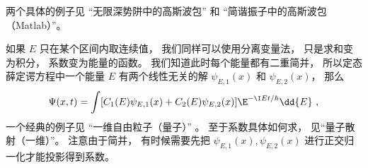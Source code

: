两个具体的例子见 “无限深势阱中的高斯波包” 和 “简谐振子中的高斯波包（Matlab）”。

如果 $E$ 只在某个区间内取连续值， 我们同样可以使用分离变量法， 只是求和变为积分， 系数变为能量的函数。 我们知道此时每个能量都有二重简并， 所以定态薛定谔方程中一个能量 $E$ 有两个线性无关的解 $\psi_{E,1}(x)$ 和 $\psi_{E,2}(x)$， 那么
\begin{equation}\label{eq_TDSE11_4}
\Psi(x, t) = \int [C_1(E) \psi_{E,1}(x) + C_2(E) \psi_{E,2}(x)] \E^{-\I E t/\hbar} \dd{E}~,
\end{equation}
一个经典的例子见 “一维自由粒子（量子）” 。 至于系数具体如何求， 见“量子散射（一维）”。 注意由于简并， 有时候需要先把 $\psi_{E,1}(x), \psi_{E,2}(x)$ 进行正交归一化才能投影得到系数。
